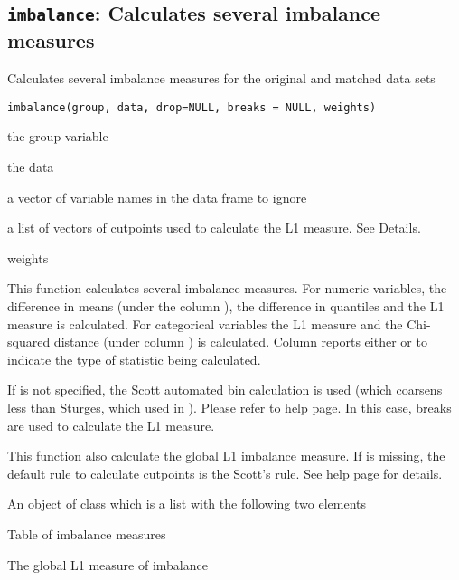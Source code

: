 \subsection{{\tt imbalance}: Calculates several imbalance measures}\label{ss:imbalance}
\begin{Description}\relax
Calculates several imbalance measures for the original
and matched data sets
\end{Description}
\begin{Usage}
\begin{verbatim}
imbalance(group, data, drop=NULL, breaks = NULL, weights)
\end{verbatim}
\end{Usage}
\begin{Arguments}
\begin{ldescription}
\item[\code{group}] the group variable
\item[\code{data}] the data
\item[\code{drop}] a vector of variable names in the data frame to ignore
\item[\code{breaks}] a list of vectors of cutpoints used to calculate the L1
measure. See Details.
\item[\code{weights}] weights
\end{ldescription}
\end{Arguments}
\begin{Details}\relax
This function calculates several imbalance measures.
For numeric variables, the difference in means (under the column
), the difference in quantiles and the L1 measure is
calculated. For categorical variables the L1 measure and the
Chi-squared distance (under column ) is calculated.
Column  reports either  or  to
indicate the type of statistic being calculated.

If  is not specified, the Scott automated bin calculation
is used (which coarsens less than Sturges, which used in
).  Please refer to  help page. In
this case, breaks are used to calculate the L1 measure.

This function also calculate the global L1 imbalance measure. 
If  is missing, the default rule to calculate cutpoints
is the Scott's rule. 
See  help page for details.
\end{Details}
\begin{Value}
An object of class  which is a list with the following
two elements
\begin{ldescription}
\item[\code{tab}] Table of imbalance measures
\item[\code{L1}] The global L1 measure of imbalance
\end{ldescription}
\end{Value}
